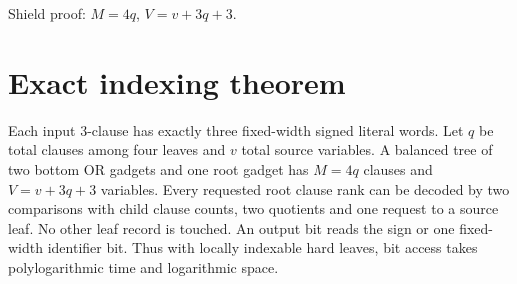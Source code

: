 \documentclass{article}
\begin{document}
Shield proof: $M=4q$, $V=v+3q+3$.
\section{Exact indexing theorem}
Each input 3-clause has exactly three fixed-width signed literal words.
Let $q$ be total clauses among four leaves and $v$ total source variables.
A balanced tree of two bottom OR gadgets and one root gadget has
$M=4q$ clauses and $V=v+3q+3$ variables.
Every requested root clause rank can be decoded by two comparisons with
child clause counts, two quotients and one request to a source leaf.
No other leaf record is touched. An output bit reads the sign or one
fixed-width identifier bit. Thus with locally indexable hard leaves,
bit access takes polylogarithmic time and logarithmic space.
\end{document}
